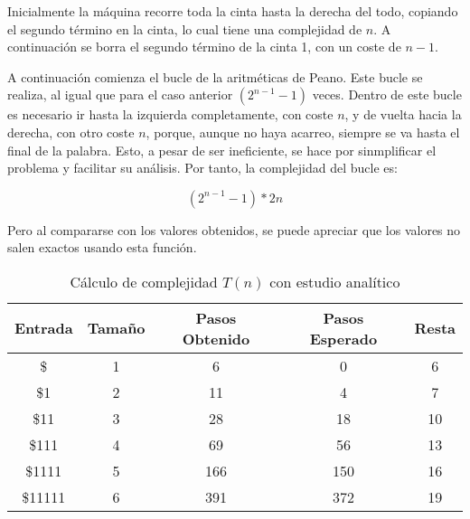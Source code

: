 \documentclass{uc3mpracticas}
\begin{document}
  \vspace{2mm}

  Inicialmente la máquina recorre toda la cinta hasta la derecha del todo, copiando el segundo término en la cinta, lo cual tiene una complejidad de $n$. A continuación se borra el segundo término de la cinta 1, con un coste de $n-1$.

  \vspace{2mm}

  A continuación comienza el bucle de la aritméticas de Peano. Este bucle se realiza, al igual que para el caso anterior $ (2^{n-1} -1) $ veces. Dentro de este bucle es necesario ir hasta la izquierda completamente, con coste $n$, y de vuelta hacia la derecha, con otro coste $n$, porque, aunque no haya acarreo, siempre se va hasta el final de la palabra. Esto, a pesar de ser ineficiente, se hace por sinmplificar el problema y facilitar su análisis. Por tanto, la complejidad del bucle es:

  $$ (2^{n-1} -1)*2n $$


  Pero al compararse con los valores obtenidos, se puede apreciar que los valores no salen exactos usando esta función.

  \begin{table}[!h]
    \centering
  \begin{tabular}{|c|c|c|c|c|}
  \hline
  \textbf{Entrada} & \textbf{Tamaño} & \textbf{Pasos Obtenido} & \textbf{Pasos Esperado} & \textbf{Resta}\\ \hline
  \$              & 1               & 6                      & 0                        &  6             \\ \hline
  \$1             & 2               & 11                      & 4                        &  7             \\ \hline
  \$11            & 3               & 28                      & 18                        &  10             \\ \hline
  \$111           & 4               & 69                     & 56                       &  13          \\ \hline
  \$1111          & 5               & 166                     & 150                       &  16        \\ \hline
  \$11111          & 6               & 391                     & 372                       &  19        \\ \hline
  \end{tabular}
  \caption{Cálculo de complejidad $T(n)$ con estudio analítico}
  \end{table}
\end{document}
